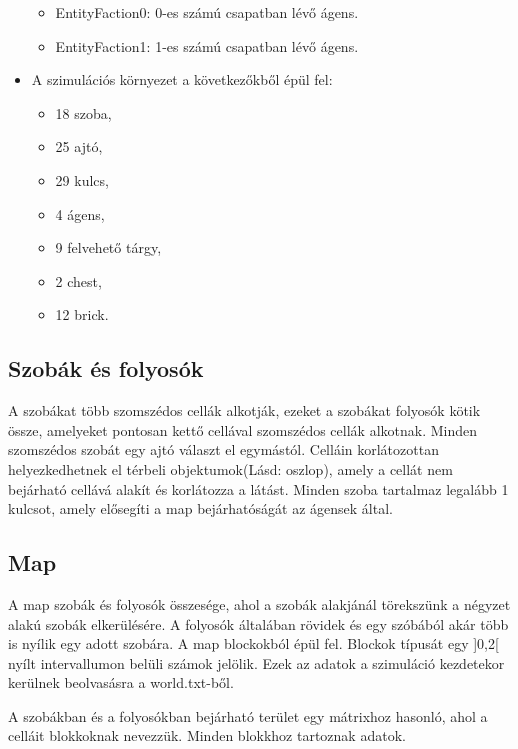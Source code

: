 \begin{itemize}
    \begin{itemize}
        \item EntityFaction0: 0-es számú csapatban lévő ágens.
        \item EntityFaction1: 1-es számú csapatban lévő ágens.
    \end{itemize}
    
    \item A szimulációs környezet a következőkből épül fel:
    
    \begin{itemize}
        \item 18 szoba, 
        \item 25 ajtó,
        \item 29 kulcs,
        \item 4 ágens,
        \item 9 felvehető tárgy,
        \item 2 chest,
        \item 12 brick.
    \end{itemize}

\end{itemize}

\subsection{Szobák és folyosók}

A szobákat több szomszédos cellák alkotják, ezeket a szobákat folyosók kötik össze, amelyeket pontosan kettő cellával szomszédos cellák alkotnak.
Minden szomszédos szobát egy ajtó választ el egymástól.
Celláin korlátozottan helyezkedhetnek el térbeli objektumok(Lásd: oszlop), amely a cellát nem bejárható cellává alakít és korlátozza a látást.
Minden szoba tartalmaz legalább 1 kulcsot, amely elősegíti a map bejárhatóságát az ágensek által.

\subsection{Map}

A map szobák és folyosók összesége, ahol a szobák alakjánál törekszünk a négyzet alakú szobák elkerülésére. A folyosók általában rövidek és egy szóbából akár több is nyílik egy adott szobára.
A map blockokból épül fel. Blockok típusát egy ]0,2[ nyílt intervallumon belüli számok jelölik.
Ezek az adatok a szimuláció kezdetekor kerülnek beolvasásra a world.txt-ből.

A szobákban és a folyosókban bejárható terület egy mátrixhoz hasonló, ahol a celláit blokkoknak nevezzük.
Minden blokkhoz tartoznak adatok.

